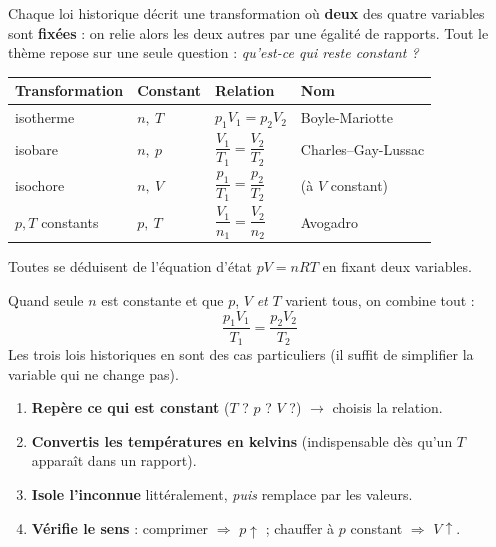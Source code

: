 \documentclass[11pt,a4paper]{article}
\begin{document}

Chaque loi historique décrit une transformation où \textbf{deux} des quatre variables sont
\textbf{fixées} : on relie alors les deux autres par une égalité de rapports. Tout le thème repose sur
une seule question : \emph{qu'est-ce qui reste constant ?}

\begin{cle}
\begin{center}\renewcommand{\arraystretch}{1.5}
\begin{tabular}{l l l l}
\toprule
\rowcolor{primary!12}
\textbf{Transformation} & \textbf{Constant} & \textbf{Relation} & \textbf{Nom}\\
\midrule
isotherme  & $n,\ T$ & $p_1 V_1 = p_2 V_2$              & Boyle-Mariotte\\
isobare    & $n,\ p$ & $\dfrac{V_1}{T_1}=\dfrac{V_2}{T_2}$ & Charles--Gay-Lussac\\
isochore   & $n,\ V$ & $\dfrac{p_1}{T_1}=\dfrac{p_2}{T_2}$ & (à $V$ constant)\\
\multicolumn{1}{l}{$p,T$ constants} & $p,\ T$ & $\dfrac{V_1}{n_1}=\dfrac{V_2}{n_2}$ & Avogadro\\
\bottomrule
\end{tabular}
\end{center}
Toutes se déduisent de l'équation d'état $pV=nRT$ en fixant deux variables.
\end{cle}

\begin{cle}
Quand seule $n$ est constante et que $p$, $V$ \emph{et} $T$ varient tous, on combine tout :
\[ \boxed{\,\dfrac{p_1 V_1}{T_1}=\dfrac{p_2 V_2}{T_2}\,} \]
Les trois lois historiques en sont des cas particuliers (il suffit de simplifier la variable qui ne
change pas).
\end{cle}

\begin{methode}
\begin{enumerate}[leftmargin=1.6em,topsep=2pt,itemsep=1.5pt]
  \item \textbf{Repère ce qui est constant} ($T$ ? $p$ ? $V$ ?) $\to$ choisis la relation.
  \item \textbf{Convertis les températures en kelvins} (indispensable dès qu'un $T$ apparaît dans un
        rapport).
  \item \textbf{Isole l'inconnue} littéralement, \emph{puis} remplace par les valeurs.
  \item \textbf{Vérifie le sens} : comprimer $\Rightarrow$ $p\!\uparrow$ ; chauffer à $p$ constant
        $\Rightarrow$ $V\!\uparrow$.
\end{enumerate}
\end{methode}
\end{document}
